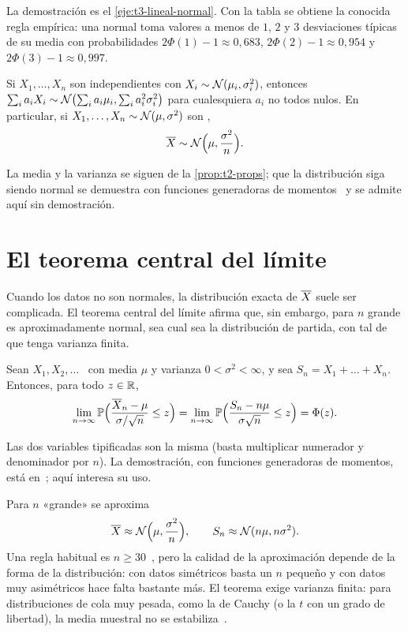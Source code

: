 La demostración es el \cref{eje:t3-lineal-normal}. Con la tabla se obtiene la conocida regla empírica: una normal toma valores a menos de $1$, $2$ y $3$ desviaciones típicas de su media con probabilidades $2\Phi(1)-1\approx0{,}683$, $2\Phi(2)-1\approx0{,}954$ y $2\Phi(3)-1\approx0{,}997$.

\begin{teorema}\label{teo:t3-suma-normales}
Si $X_1,\dots,X_n$ son independientes con $X_i\sim\mathcal{N}(\mu_i,\sigma_i^{2})$, entonces $\sum_ia_iX_i\sim\mathcal{N}\bigl(\sum_ia_i\mu_i,\sum_ia_i^{2}\sigma_i^{2}\bigr)$ para cualesquiera $a_i$ no todos nulos. En particular, si $X_1,\dots,X_n\sim\mathcal{N}(\mu,\sigma^{2})$ son \iid,
\[
\overline{X}\sim\mathcal{N}\Bigl(\mu,\frac{\sigma^{2}}{n}\Bigr).
\]
\end{teorema}

La media y la varianza se siguen de la \cref{prop:t2-props}; que la distribución siga siendo normal se demuestra con funciones generadoras de momentos~\cite[§6.6]{bh} y se admite aquí sin demostración.

\section{El teorema central del límite}

Cuando los datos no son normales, la distribución exacta de $\overline{X}$ suele ser complicada. El teorema central del límite afirma que, sin embargo, para $n$ grande es aproximadamente normal, sea cual sea la distribución de partida, con tal de que tenga varianza finita.

\begin{teorema}\label{teo:t3-tcl}
Sean $X_1,X_2,\dots$ \iid\ con media $\mu$ y varianza $0<\sigma^{2}<\infty$, y sea $S_n=X_1+\dots+X_n$. Entonces, para todo $z\in\mathbb{R}$,
\[
\lim_{n\to\infty}\mathbb{P}\Bigl(\frac{\overline{X}_n-\mu}{\sigma/\sqrt n}\le z\Bigr)=\lim_{n\to\infty}\mathbb{P}\Bigl(\frac{S_n-n\mu}{\sigma\sqrt n}\le z\Bigr)=\Phi(z).
\]
\end{teorema}

Las dos variables tipificadas son la misma (basta multiplicar numerador y denominador por $n$). La demostración, con funciones generadoras de momentos, está en~\cite[§10.3]{bh}; aquí interesa su uso.

\begin{observacion}\label{obs:t3-uso}
Para $n$ «grande» se aproxima
\[
\overline{X}\approx\mathcal{N}\Bigl(\mu,\frac{\sigma^{2}}{n}\Bigr),\qquad S_n\approx\mathcal{N}(n\mu,n\sigma^{2}).
\]
Una regla habitual es $n\ge30$~\cite[§7.1]{openstax}, pero la calidad de la aproximación depende de la forma de la distribución: con datos simétricos basta un $n$ pequeño y con datos muy asimétricos hace falta bastante más. El teorema exige varianza finita: para distribuciones de cola muy pesada, como la de Cauchy (o la $t$ con un grado de libertad), la media muestral no se estabiliza~\cite[§10.3]{bh}.
\end{observacion}

